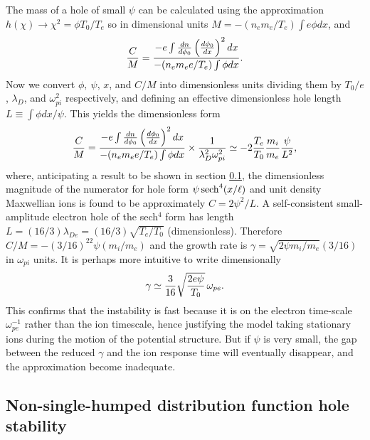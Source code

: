 \documentclass[pre]{revtex4-2}
\begin{document}
The mass of a hole of small $\psi$ can be calculated using the
approximation $h(\chi)\to \chi^2=\phi T_0/T_e$ so in dimensional units
$M=-(n_em_e/T_e)\int e\phi dx$, and
\begin{equation}
  \label{eq:CbyM}
  {C\over M}= {-e\int {dn\over d\phi_0}\left(d\phi_0\over dx\right)^2 dx
    \over -(n_em_ee/T_e)\int \phi dx }.
\end{equation}
Now we convert $\phi,\ \psi$, $x$, and $C/M$ into dimensionless units
dividing them by $T_0/e$, $\lambda_D$, and $\omega_{pi}^2$
respectively, and defining an effective dimensionless hole length
$L\equiv\int\phi dx/\psi$. This yields the dimensionless form
\begin{equation}
  \label{eq:CbyMless}
   {C\over M}= {-e\int {dn\over d\phi_0}\left(d\phi_0\over dx\right)^2 dx
     \over -(n_em_ee/T_e)\int \phi dx } \times {1\over
     \lambda_D^2 \omega_{pi}^2}
   \simeq -2 {T_e\over T_0} {m_i\over m_e} {\psi \over L^2},
 \end{equation}
 where, anticipating a result to be shown in section \ref{section2.3},
 the dimensionless magnitude of the numerator for hole form
 $\psi\, {\rm sech}^4(x/\ell)$ and unit density Maxwellian ions is
 found to be approximately $C=2\psi^2/L$.  A self-consistent
 small-amplitude electron hole of the sech$^4$ form has length
 $L=(16/3)\lambda_{De}= (16/3)\sqrt{T_e/T_0}$ (dimensionless).
 Therefore $C/M=-(3/16)^22\psi (m_i/m_e)$ and the growth rate is
 $\gamma=\sqrt{2\psi m_i/m_e}(3/16)$ in $\omega_{pi}$ units. It is
 perhaps more intuitive to write dimensionally
 \begin{equation}
   \label{eq:gamma}
 \gamma\simeq{3\over 16}\sqrt{2e\psi\over T_0}\,\omega_{pe}.   
 \end{equation}
 This confirms that the
 instability is fast because it is on the electron time-scale
 $\omega_{pe}^{-1}$ rather than the ion timescale, hence justifying
 the model taking stationary ions during the motion of the potential
 structure. But if $\psi$ is very small, the gap between the reduced
 $\gamma$ and the ion response time will eventually disappear, and the
 approximation become inadequate.



\subsection{Non-single-humped distribution function hole stability}
\label{section2.3}
\end{document}
